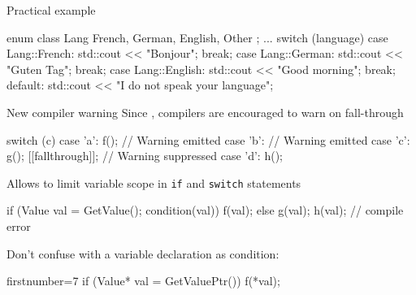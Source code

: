 \begin{frame}[fragile]
  \begin{exampleblock}{Practical example}
    \begin{cppcode*}{}
      enum class Lang { French, German, English, Other };
      ...
      switch (language) {
      case Lang::French:
        std::cout << "Bonjour";
        break;
       case Lang::German:
        std::cout << "Guten Tag";
        break;
      case Lang::English:
        std::cout << "Good morning";
        break;
      default:
        std::cout << "I do not speak your language";
      }
    \end{cppcode*}
  \end{exampleblock}
\end{frame}


\begin{frame}[fragile]
  \begin{block}{New compiler warning}
    Since , compilers are encouraged to warn on fall-through
  \end{block}
  \begin{exampleblock}{}
    \begin{cppcode*}{}
      switch (c) {
        case 'a':
          f();    // Warning emitted
        case 'b': // Warning emitted
        case 'c':
          g();
          [[fallthrough]]; // Warning suppressed
        case 'd':
          h();
      }
    \end{cppcode*}
  \end{exampleblock}
\end{frame}

\begin{frame}[fragile]
  \begin{block}{}
    Allows to limit variable scope in \texttt{if} and \texttt{switch} statements
  \end{block}
  \begin{exampleblock}{}
    \begin{cppcode*}{}
      if (Value val = GetValue(); condition(val)) {
        f(val);
      } else {
        g(val);
      }
      h(val); // compile error
    \end{cppcode*}
  \end{exampleblock}
  \pause
  \begin{alertblock}{}
    Don't confuse with a variable declaration as condition:
    \begin{cppcode*}{firstnumber=7}
      if (Value* val = GetValuePtr())
        f(*val);
    \end{cppcode*}
  \end{alertblock}
\end{frame}

